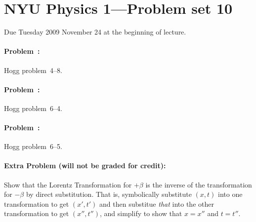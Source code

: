 \documentclass[12pt]{article}
\begin{document}
\thispagestyle{empty}

\section*{NYU Physics 1---Problem set 10}

Due Tuesday 2009 November 24 at the beginning of lecture.

\paragraph{Problem~\theproblem:}%
Hogg problem~4--8.

\paragraph{Problem~\theproblem:}%
Hogg problem~6--4.

\paragraph{Problem~\theproblem:}%
Hogg problem~6--5.

\paragraph{Extra Problem (will not be graded for credit):}%
Show that the Lorentz Transformation for $+\beta$ is the inverse of
the transformation for $-\beta$ by direct substitution.  That is,
symbolically substitute $(x, t)$ into one transformation to get $(x',
t')$ and then substitue \emph{that} into the other transformation to
get $(x'', t'')$, and simplify to show that $x=x''$ and $t=t''$.
\end{document}
